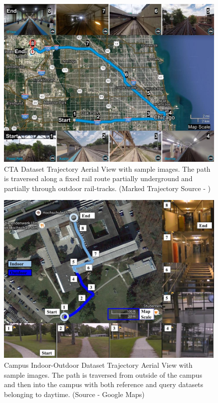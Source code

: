 \documentclass[letterpaper, 10 pt, conference]{ieeeconf}  %
\begin{document}
\begin{figure}[h]
\centering
 \includegraphics[scale=0.23]{cta-datasetTrajSampleImages}
 \caption{CTA Dataset Trajectory Aerial View with sample images. The path is traversed along a fixed rail route partially underground and partially through outdoor rail-tracks. (Marked Trajectory Source - \cite{ctaTrajGMap})}
 \label{fig:ctaTraj}
\end{figure}

\begin{figure}[h]
\centering
 \includegraphics[scale=0.23]{campus-datasetTrajSampleImages}
 \caption{Campus Indoor-Outdoor Dataset Trajectory Aerial View with sample images. The path is traversed from outside of the campus and then into the campus with both reference and query datasets belonging to daytime. (Source - Google Maps)}
 \label{fig:campusTraj}
\end{figure}
\end{document}
